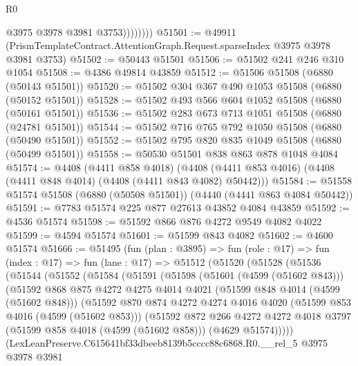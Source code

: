 \begin{lexlean}{R0}
\begin{coremodule}
                    @3975
                    @3978
                    @3981
                    @3753))))))))
@51501 := @49911 (PrismTemplateContract.AttentionGraph.Request.sparseIndex @3975 @3978 @3981 @3753)
@51502 := @50443 @51501
@51506 := @51502 @241 @246 @310 @1054
@51508 := @4386 @49814 @43859
@51512 := @51506 @51508 (@6880 (@50143 @51501))
@51520 := @51502 @304 @367 @490 @1053 @51508 (@6880 (@50152 @51501))
@51528 := @51502 @493 @566 @604 @1052 @51508 (@6880 (@50161 @51501))
@51536 := @51502 @283 @673 @713 @1051 @51508 (@6880 (@24781 @51501))
@51544 := @51502 @716 @765 @792 @1050 @51508 (@6880 (@50490 @51501))
@51552 := @51502 @795 @820 @835 @1049 @51508 (@6880 (@50499 @51501))
@51558 := @50530 @51501 @838 @863 @878 @1048 @4084
@51574 := @4408
    (@4411 @858 @4018)
    (@4408 (@4411 @853 @4016) (@4408 (@4411 @848 @4014) (@4408 (@4411 @843 @4082) @50442)))
@51584 := @51558 @51574 @51508 (@6880 (@50508 @51501)) (@4440 (@4441 @863 @4084 @50442))
@51591 := @7783 @51574 @225 @877 @27613 @43852 @4084 @43859
@51592 := @4536 @51574
@51598 := @51592 @866 @876 @4272 @9549 @4082 @4022
@51599 := @4594 @51574
@51601 := @51599 @843 @4082
@51602 := @4600 @51574
@51666 := @51495
    (fun (plan : @3895) =>
    fun (role : @17) =>
    fun (index : @17) =>
    fun (lane : @17) =>
    @51512
      (@51520
        (@51528
          (@51536
            (@51544
              (@51552
                (@51584
                  (@51591
                    (@51598
                      (@51601 (@4599 (@51602 @843)))
                      (@51592
                        @868
                        @875
                        @4272
                        @4275
                        @4014
                        @4021
                        (@51599 @848 @4014 (@4599 (@51602 @848)))
                        (@51592
                          @870
                          @874
                          @4272
                          @4274
                          @4016
                          @4020
                          (@51599 @853 @4016 (@4599 (@51602 @853)))
                          (@51592
                            @872
                            @266
                            @4272
                            @4272
                            @4018
                            @3797
                            (@51599 @858 @4018 (@4599 (@51602 @858)))
                            (@4629 @51574)))))
                    (LexLeanPreserve.C615641bf33dbeeb8139b5cccc88c6868.R0.__rel_5
                      @3975
                      @3978
                      @3981

\end{coremodule}
\end{lexlean}
